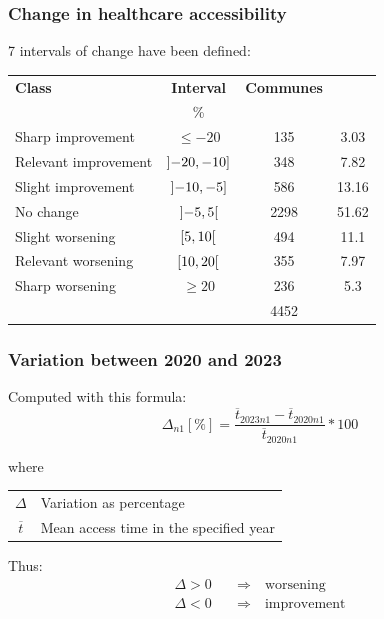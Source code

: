 \begin{frame}
	\frametitle{Change in healthcare accessibility}
	
	7 intervals of change have been defined:
	\begin{center}
	\begin{tabular}{l c S[table-format=4.0] S[table-alignment-mode=marker]}
		\toprule
		\textbf{Class} & \textbf{Interval} & \textbf{Communes} & \\
		& \% &  & \text{\%}\\
		\midrule
		Sharp improvement & $\leq -20$ & 135 & 3.03\\
		Relevant improvement & $\linterval{-20}{-10}$ & 348 & 7.82\\
		Slight improvement & $\linterval{-10}{-5}$ & 586 & 13.16\\
		No change & $\interval[open]{-5}{5}$ & 2298 & 51.62\\
		Slight worsening & $\rinterval{5}{10}$ & 494 & 11.1\\
		Relevant worsening & $\rinterval{10}{20}$ & 355 & 7.97\\
		Sharp worsening & $\geq 20$ & 236 & 5.3\\
		\bottomrule
		& & 4452 & \\
	\end{tabular}
	\end{center}
	
\end{frame}


\begin{frame}
	\frametitle{Variation between 2020 and 2023}
	
	Computed with this formula:
	\begin{equation*}
		\Delta_{n1} [\%] = \frac{\overline{t}_{2023n1} - \overline{t}_{2020n1}}{\overline{t}_{2020n1}} * 100
	\end{equation*}
	
	where\\[2ex]
	\begin{tabular}{c l}
		$\Delta$ & Variation as percentage\\
		$\overline{t}$ & Mean access time in the specified year\\
	\end{tabular}
	\bigskip
	
	Thus:
	\begin{align*}
		\Delta > 0 \quad & \Rightarrow \quad \text{worsening}\\
		\Delta < 0 \quad & \Rightarrow \quad \text{improvement} 
	\end{align*}
	
\end{frame}


